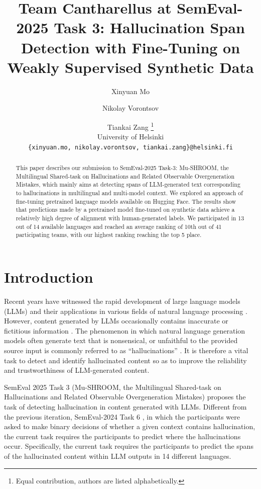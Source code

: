 \documentclass[11pt]{article}
\title{Team Cantharellus at SemEval-2025 Task 3: Hallucination Span Detection with Fine-Tuning on Weakly Supervised Synthetic Data}
\author{Xinyuan Mo \and Nikolay Vorontsov \and Tiankai Zang \thanks{\hspace{0.6em}Equal contribution, authors are listed alphabetically.} \\
  University of Helsinki \\
  \texttt{\{xinyuan.mo, nikolay.vorontsov, tiankai.zang\}@helsinki.fi} \\}
\begin{document}
\maketitle
\begin{abstract}
This paper describes our submission to SemEval-2025 Task-3: Mu-SHROOM, the Multilingual Shared-task on Hallucinations and Related Observable Overgeneration Mistakes, which mainly aims at detecting spans of LLM-generated text corresponding to hallucinations in multilingual and multi-model context. We explored an approach of fine-tuning pretrained language models available on Hugging Face. The results show that predictions made by a pretrained model fine-tuned on synthetic data achieve a relatively high degree of alignment with human-generated labels. We participated in 13 out of 14 available languages and reached an average ranking of 10th out of 41 participating teams, with our highest ranking reaching the top 5 place.


\end{abstract}


\section{Introduction}
Recent years have witnessed the rapid development of large language models (LLMs) and their applications in various fields of natural language processing \cite{wei2022chain, zhao2023survey}. However, content generated by LLMs occasionally contains inaccurate or fictitious information \cite{perkovic2024hallucinations}. The phenomenon in which natural language generation models often generate text that is nonsensical, or unfaithful to the provided source input is commonly referred to as “hallucinations” \cite{ji2023survey}. It is therefore a vital task to detect and identify hallucinated content so as to improve the reliability and trustworthiness of LLM-generated content.

SemEval 2025 Task 3 (Mu-SHROOM, the Multilingual Shared-task on Hallucinations and Related Observable Overgeneration Mistakes) \cite {vazquez-etal-2025-mu-shroom} proposes the task of detecting hallucination in content generated with LLMs. Different from the previous iteration, SemEval-2024 Task 6 \cite{mickus2024semeval}, in which the participants were asked to make binary decisions of whether a given context contains hallucination, the current task requires the participants to predict where the hallucinations occur. Specifically, the current task requires the participants to predict the spans of the hallucinated content within LLM outputs in 14 different languages.  
\end{document}
